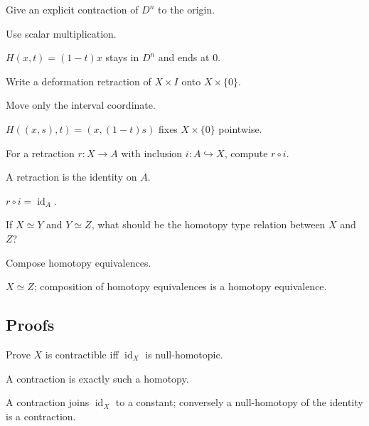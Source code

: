 \begin{exercise}\label{exr:viii02-ped-02}
Give an explicit contraction of $D^n$ to the origin.
\end{exercise}
\begin{hint}
Use scalar multiplication.
\end{hint}
\begin{solution}
$H(x,t)=(1-t)x$ stays in $D^n$ and ends at $0$.
\end{solution}

\begin{exercise}\label{exr:viii02-ped-03}
Write a deformation retraction of $X\times I$ onto $X\times\{0\}$.
\end{exercise}
\begin{hint}
Move only the interval coordinate.
\end{hint}
\begin{solution}
$H((x,s),t)=(x,(1-t)s)$ fixes $X\times\{0\}$ pointwise.
\end{solution}

\begin{exercise}\label{exr:viii02-ped-04}
For a retraction $r:X\to A$ with inclusion $i:A\hookrightarrow X$, compute $r\circ i$.
\end{exercise}
\begin{hint}
A retraction is the identity on $A$.
\end{hint}
\begin{solution}
$r\circ i=\operatorname{id}_A$.
\end{solution}

\begin{exercise}\label{exr:viii02-ped-05}
If $X\simeq Y$ and $Y\simeq Z$, what should be the homotopy type relation between $X$ and $Z$?
\end{exercise}
\begin{hint}
Compose homotopy equivalences.
\end{hint}
\begin{solution}
$X\simeq Z$; composition of homotopy equivalences is a homotopy equivalence.
\end{solution}

\subsection*{Proofs}

\begin{exercise}\label{exr:viii02-ped-06}
Prove $X$ is contractible iff $\operatorname{id}_X$ is null-homotopic.
\end{exercise}
\begin{hint}
A contraction is exactly such a homotopy.
\end{hint}
\begin{solution}
A contraction joins $\operatorname{id}_X$ to a constant; conversely a null-homotopy of the identity is a contraction.
\end{solution}

